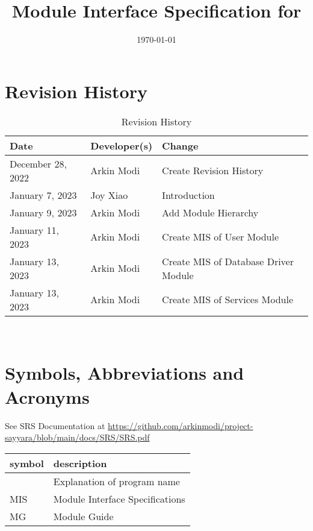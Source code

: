 \documentclass[12pt, titlepage]{article}
\begin{document}
\title{Module Interface Specification for \progname{}}

\author{\authname}

\date{\today}

\maketitle


\section{Revision History}

\begin{table}[hp]
	\caption{Revision History} \label{TblRevisionHistory}
	\begin{tabularx}{\textwidth}{llX}
		\toprule
		\textbf{Date}     & \textbf{Developer(s)} & \textbf{Change}                      \\
		\midrule
		December 28, 2022 & Arkin Modi            & Create Revision History              \\
		January 7, 2023   & Joy Xiao              & Introduction                         \\
		January 9, 2023   & Arkin Modi            & Add Module Hierarchy                 \\
		January 11, 2023  & Arkin Modi            & Create MIS of User Module            \\
		January 13, 2023  & Arkin Modi            & Create MIS of Database Driver Module \\
		January 13, 2023  & Arkin Modi            & Create MIS of Services Module        \\
		\bottomrule
	\end{tabularx}
\end{table}

~\newpage

\section{Symbols, Abbreviations and Acronyms}

See SRS Documentation at
\url{https://github.com/arkinmodi/project-sayyara/blob/main/docs/SRS/SRS.pdf}


\begin{tabular}{l l}
	\toprule
	\textbf{symbol} & \textbf{description}            \\
	\midrule
	\progname       & Explanation of program name     \\
	MIS             & Module Interface Specifications \\
	MG              & Module Guide                    \\
	\bottomrule
\end{tabular}
\end{document}
